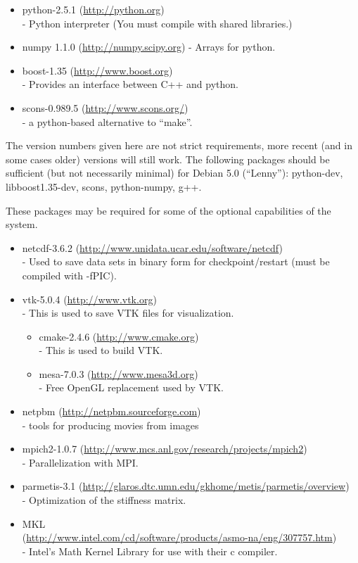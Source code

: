 \begin{itemize}
 \item python-2.5.1 (\url{http://python.org}) \\
- Python  interpreter (You must compile with shared libraries.)
\item numpy 1.1.0 (\url{http://numpy.scipy.org})
- Arrays for python.
\item boost-1.35 (\url{http://www.boost.org}) \\
- Provides an interface between C++ and python.
\item scons-0.989.5 (\url{http://www.scons.org/}) \\
- a python-based alternative to ``make''.
\end{itemize}

The version numbers given here are not strict requirements, more recent (and in some cases older) versions will
still work. 
The following packages should be sufficient (but not necessarily minimal) for Debian 5.0 (``Lenny''):
python-dev, libboost1.35-dev, scons, python-numpy, g++.


These packages may be required for some of the optional capabilities of the system.

\begin{itemize}
 \item netcdf-3.6.2 (\url{http://www.unidata.ucar.edu/software/netcdf}) \\-
        Used to save data sets in binary form for checkpoint/restart (must be compiled with -fPIC).
\item vtk-5.0.4 (\url{http://www.vtk.org}) \\-
        This is used to save VTK files for visualization.
  \begin{itemize}
  \item cmake-2.4.6 (\url{http://www.cmake.org}) \\-
        This is used to build VTK.
  \item     mesa-7.0.3 (\url{http://www.mesa3d.org})\\-
        Free OpenGL replacement used by VTK.
  \end{itemize}
\item netpbm (\url{http://netpbm.sourceforge.com}) \\-
    tools for producing movies from images
\item     mpich2-1.0.7 (\url{http://www.mcs.anl.gov/research/projects/mpich2}) \\-
        Parallelization with MPI.
\item     parmetis-3.1 (\url{http://glaros.dtc.umn.edu/gkhome/metis/parmetis/overview}) \\-
        Optimization of the stiffness matrix.
\item MKL \\(\url{http://www.intel.com/cd/software/products/asmo-na/eng/307757.htm}) \\-
        Intel's Math Kernel Library for use with their c compiler.
\end{itemize}

